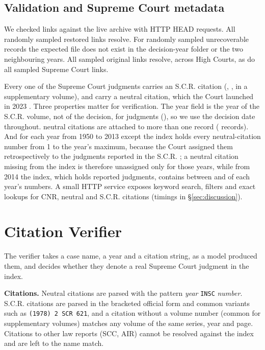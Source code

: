 \documentclass[conference]{IEEEtran}
\begin{document}
\subsection{Validation and Supreme Court metadata}
We checked links against the live archive with HTTP HEAD requests. All \RecoveredChecked{} randomly sampled restored links resolve. For \UnresolvedChecked{} randomly sampled unrecoverable records the expected file does not exist in the decision-year folder or the two neighbouring years. All \NonmobileChecked{} sampled original links resolve, across \NonmobileCourts{} High Courts, as do all \SCLinksChecked{} sampled Supreme Court links.

Every one of the \CorpusSC{} Supreme Court judgments carries an S.C.R. citation (\SCSupp{}, \SCSuppPct, in a supplementary volume), and \SCwithNeutral{} carry a neutral citation, which the Court launched in 2023 \cite{scneutral}. Three properties matter for verification. The year field is the year of the S.C.R. volume, not of the decision, for \SCYearNe{} judgments (\SCYearNePct), so we use the decision date throughout. \SCDupGroups{} neutral citations are attached to more than one record (\SCDupRows{} records). And for each year from 1950 to 2013 except \INSCIncompleteList{} the index holds every neutral-citation number from 1 to the year's maximum, because the Court assigned them retrospectively to the judgments reported in the S.C.R. \cite{scneutral2}; a neutral citation missing from the index is therefore unassigned only for those \INSCCompleteCount{} years, while from 2014 the index, which holds reported judgments, contains between \INSCCovMin{} and \INSCCovMax{} of each year's numbers. A small HTTP service exposes keyword search, filters and exact lookups for CNR, neutral and S.C.R. citations (timings in \S\ref{sec:discussion}).

\section{Citation Verifier}
\label{sec:verifier}
The verifier takes a case name, a year and a citation string, as a model produced them, and decides whether they denote a real Supreme Court judgment in the index.

\textbf{Citations.} Neutral citations are parsed with the pattern \emph{year} \texttt{INSC} \emph{number}. S.C.R. citations are parsed in the bracketed official form and common variants such as \texttt{(1978) 2 SCR 621}, and a citation without a volume number (common for supplementary volumes) matches any volume of the same series, year and page. Citations to other law reports (SCC, AIR) cannot be resolved against the index and are left to the name match.
\end{document}
